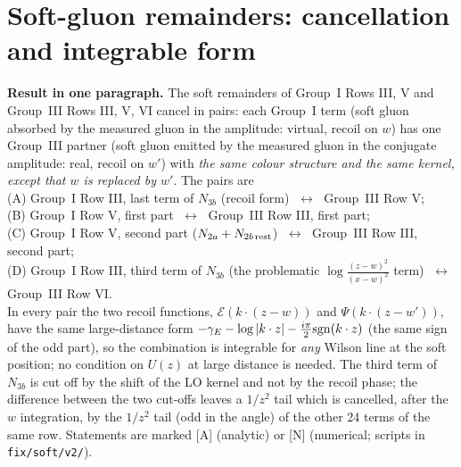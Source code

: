\section{Soft-gluon remainders: cancellation and integrable form}\label{sec:softfix}
\noindent\textbf{Result in one paragraph.} The soft remainders of Group~I Rows III, V and Group~III Rows III, V, VI cancel in pairs: each Group~I term (soft gluon absorbed by the measured gluon in the amplitude: virtual, recoil on $w$) has one Group~III partner (soft gluon emitted by the measured gluon in the conjugate amplitude: real, recoil on $w'$) with \emph{the same colour structure and the same kernel, except that $w$ is replaced by $w'$}. The pairs are\\[2pt]
\hspace*{1em}(A) Group~I Row III, last term of $N_{3b}$ (recoil form) $\;\leftrightarrow\;$ Group~III Row V;\\
\hspace*{1em}(B) Group~I Row V, first part $\;\leftrightarrow\;$ Group~III Row III, first part;\\
\hspace*{1em}(C) Group~I Row V, second part ($N_{2a}+N_{2b\,\rm rest}$) $\;\leftrightarrow\;$ Group~III Row III, second part;\\
\hspace*{1em}(D) Group~I Row III, third term of $N_{3b}$ (the problematic $\log\frac{(z-w)^{2}}{(x-w)^{2}}$ term) $\;\leftrightarrow\;$ Group~III Row VI.\\[2pt]
In every pair the two recoil functions, $\mathcal{E}(k\cdot(z-w))$ and $\Psi(k\cdot(z-w'))$, have the same large-distance form $-\gamma_{E}-\log|k\cdot z|-\frac{i\pi}{2}{\rm sgn}(k\cdot z)$ (the same sign of the odd part), so the combination is integrable for \emph{any} Wilson line at the soft position; no condition on $U(z)$ at large distance is needed. The third term of $N_{3b}$ is cut off by the shift of the LO kernel and not by the recoil phase; the difference between the two cut-offs leaves a $1/z^{2}$ tail which is cancelled, after the $w$ integration, by the $1/z^{2}$ tail (odd in the angle) of the other 24 terms of the same row. Statements are marked [A] (analytic) or [N] (numerical; scripts in \texttt{fix/soft/v2/}).

